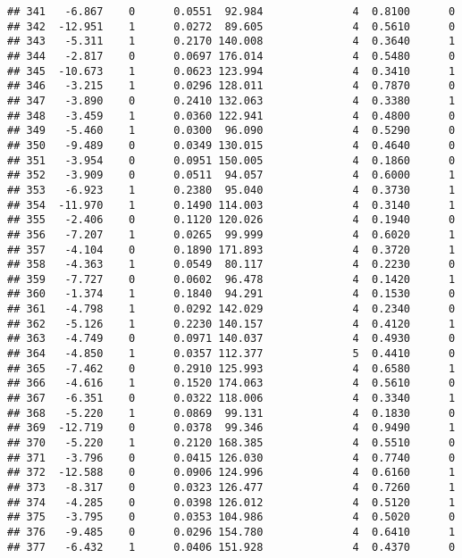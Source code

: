 \documentclass[
]{article}
\begin{document}
\begin{verbatim}
## 341   -6.867    0      0.0551  92.984              4  0.8100      0
## 342  -12.951    1      0.0272  89.605              4  0.5610      0
## 343   -5.311    1      0.2170 140.008              4  0.3640      1
## 344   -2.817    0      0.0697 176.014              4  0.5480      0
## 345  -10.673    1      0.0623 123.994              4  0.3410      1
## 346   -3.215    1      0.0296 128.011              4  0.7870      0
## 347   -3.890    0      0.2410 132.063              4  0.3380      1
## 348   -3.459    1      0.0360 122.941              4  0.4800      0
## 349   -5.460    1      0.0300  96.090              4  0.5290      0
## 350   -9.489    0      0.0349 130.015              4  0.4640      0
## 351   -3.954    0      0.0951 150.005              4  0.1860      0
## 352   -3.909    0      0.0511  94.057              4  0.6000      1
## 353   -6.923    1      0.2380  95.040              4  0.3730      1
## 354  -11.970    1      0.1490 114.003              4  0.3140      1
## 355   -2.406    0      0.1120 120.026              4  0.1940      0
## 356   -7.207    1      0.0265  99.999              4  0.6020      1
## 357   -4.104    0      0.1890 171.893              4  0.3720      1
## 358   -4.363    1      0.0549  80.117              4  0.2230      0
## 359   -7.727    0      0.0602  96.478              4  0.1420      1
## 360   -1.374    1      0.1840  94.291              4  0.1530      0
## 361   -4.798    1      0.0292 142.029              4  0.2340      0
## 362   -5.126    1      0.2230 140.157              4  0.4120      1
## 363   -4.749    0      0.0971 140.037              4  0.4930      0
## 364   -4.850    1      0.0357 112.377              5  0.4410      0
## 365   -7.462    0      0.2910 125.993              4  0.6580      1
## 366   -4.616    1      0.1520 174.063              4  0.5610      0
## 367   -6.351    0      0.0322 118.006              4  0.3340      1
## 368   -5.220    1      0.0869  99.131              4  0.1830      0
## 369  -12.719    0      0.0378  99.346              4  0.9490      1
## 370   -5.220    1      0.2120 168.385              4  0.5510      0
## 371   -3.796    0      0.0415 126.030              4  0.7740      0
## 372  -12.588    0      0.0906 124.996              4  0.6160      1
## 373   -8.317    0      0.0323 126.477              4  0.7260      1
## 374   -4.285    0      0.0398 126.012              4  0.5120      1
## 375   -3.795    0      0.0353 104.986              4  0.5020      0
## 376   -9.485    0      0.0296 154.780              4  0.6410      1
## 377   -6.432    1      0.0406 151.928              4  0.4370      0

\end{verbatim}
\end{document}
